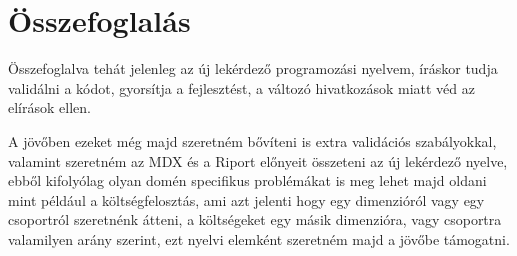 \chapter{Összefoglalás}\label{sect:Summary}
Összefoglalva tehát jelenleg az új lekérdező programozási nyelvem, íráskor tudja
validálni a kódot, gyorsítja a fejlesztést, a változó hivatkozások miatt véd az
elírások ellen.

A jövőben ezeket még majd szeretném bővíteni is extra validációs
szabályokkal, valamint szeretném az MDX és a Riport előnyeit összeteni az új
lekérdező nyelve, ebből kifolyólag olyan domén specifikus problémákat is meg
lehet majd oldani mint például a költségfelosztás, ami azt jelenti hogy egy
dimenzióról vagy egy csoportról szeretnénk átteni, a költségeket egy másik
dimenzióra, vagy csoportra valamilyen arány szerint, ezt nyelvi elemként
szeretném majd a jövőbe támogatni.
